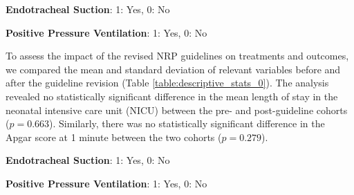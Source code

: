 \documentclass[11pt]{article}
\begin{document}
\begin{table}[h]
\caption{Association between treatment policy and treatments}
\label{table:association_treatments_1}
\begin{threeparttable}
\renewcommand{\TPTminimum}{\linewidth}
\begin{tablenotes}
\footnotesize
\item \textbf{Endotracheal Suction}: 1: Yes, 0: No
\item \textbf{Positive Pressure Ventilation}: 1: Yes, 0: No
\end{tablenotes}
\end{threeparttable}
\end{table}


To assess the impact of the revised NRP guidelines on treatments and outcomes, we compared the mean and standard deviation of relevant variables before and after the guideline revision (Table {}\ref{table:descriptive_stats_0}). The analysis revealed no statistically significant difference in the mean length of stay in the neonatal intensive care unit (NICU) between the pre- and post-guideline cohorts ($p = 0.663$). Similarly, there was no statistically significant difference in the Apgar score at 1 minute between the two cohorts ($p = 0.279$).

\begin{table}[h]
\caption{Means and standard deviations of treatments and outcomes before and after 2015}
\label{table:descriptive_stats_0}
\begin{threeparttable}
\renewcommand{\TPTminimum}{\linewidth}
\begin{tablenotes}
\footnotesize
\item \textbf{Endotracheal Suction}: 1: Yes, 0: No
\item \textbf{Positive Pressure Ventilation}: 1: Yes, 0: No
\end{tablenotes}
\end{threeparttable}
\end{table}
\end{document}
